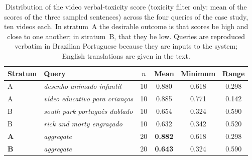 \begin{table}[!t]
\centering
\caption{Distribution of the video verbal-toxicity score (toxicity filter only: mean of the scores of the three sampled sentences) across the four queries of the case study, ten videos each. In stratum~A the desirable outcome is that scores be high and close to one another; in stratum~B, that they be low. Queries are reproduced verbatim in Brazilian Portuguese because they are inputs to the system; English translations are given in the text.}
\label{tab:estratos}
\begin{tabular}{llcccc}
\toprule
Stratum & Query & $n$ & Mean & Minimum & Range \\
\midrule
A & \emph{desenho animado infantil} & 10 & 0.880 & 0.618 & 0.298 \\
A & \emph{vídeo educativo para crianças} & 10 & 0.885 & 0.771 & 0.142 \\
B & \emph{south park português dublado} & 10 & 0.654 & 0.324 & 0.590 \\
B & \emph{rick and morty engraçado} & 10 & 0.632 & 0.342 & 0.520 \\
\midrule
\textbf{A} & \emph{aggregate} & 20 & \textbf{0.882} & 0.618 & 0.298 \\
\textbf{B} & \emph{aggregate} & 20 & \textbf{0.643} & 0.324 & 0.590 \\
\bottomrule
\end{tabular}
\end{table}
